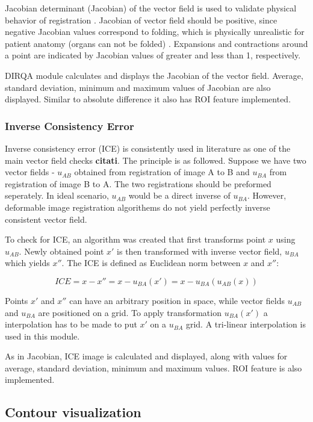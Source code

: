 \documentclass[type=dr, dr=rernat, accentcolor=tud7b,colorbacktitle, bigchapter, openright, twoside, 12pt ]{tudthesis}
\begin{document}
Jacobian determinant (Jacobian) of the vector field is used to validate physical behavior of registration \cite{Leow2007}. Jacobian of vector field should be positive, since negative Jacobian values correspond to folding, which is physically unrealistic for patient anatomy (organs can not be folded) \cite{Chen2008, Rey2002}. Expansions and contractions around a point are indicated by Jacobian values of greater and less than 1, respectively. 

DIRQA module calculates and displays the Jacobian of the vector field. Average, standard deviation, minimum and maximum values of Jacobian are also displayed. Similar to absolute difference it also has ROI feature implemented.

\subsubsection{Inverse Consistency Error}

Inverse consistency error (ICE) is consistently used in literature as one of the main vector field checks \textbf{citati}. The principle is as followed. Suppose we have two vector fields - $u_{AB}$ obtained from registration of image A to B and $u_{BA}$ from registration of image B to A. The two registrations
should be preformed seperately. In ideal scenario, $u_{AB}$ would be a direct inverse of $u_{BA}$. However, deformable image registration algorithems do not yield perfectly inverse consistent vector field.

To check for ICE, an algorithm was created that first transforms point $x$ using $u_{AB}$. Newly obtained point $x'$ is then transformed with inverse vector
field, $u_{BA}$ which yields $x''$. The ICE is defined as Euclidean norm between $x$ and $x''$:

\begin{equation}
ICE = x - x'' = x - u_{BA}(x') = x - u_{BA}(u_{AB}(x))
\end{equation}

Points $x'$ and $x''$ can have an arbitrary position in space, while vector fields $u_{AB}$ and $u_{BA}$ are positioned on a grid. To apply transformation $u_{BA}(x')$ a interpolation has to be made to put $x'$ on a $u_{BA}$ grid. A tri-linear interpolation is used in this module.

As in Jacobian, ICE image is calculated and displayed, along with values for average, standard deviation, minimum and maximum values. ROI feature is also implemented.


\subsection{Contour visualization}
\end{document}
